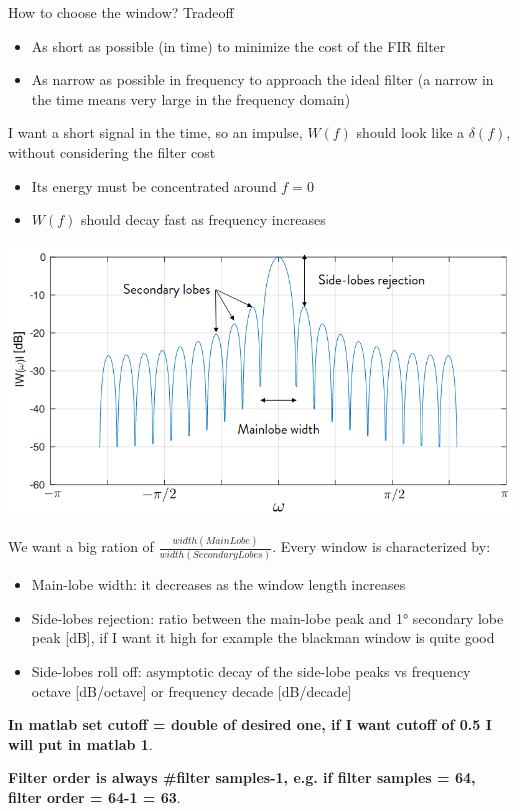 How to choose the window? Tradeoff
\begin{itemize}
    \item As short as possible (in time) to minimize the cost of the FIR filter
    \item As narrow as possible in frequency to approach the ideal filter (a narrow in the time means very large in the frequency domain)
\end{itemize}
I want a short signal in the time, so an impulse, $W(f)$ should look like a $\delta(f)$, without considering the filter cost
\begin{itemize}
    \item Its energy must be concentrated around $f=0$
    \item $W(f)$ should decay fast as frequency increases
\end{itemize}
\begin{center}
    \includegraphics[width=1\textwidth]{images/lobe.png}
\end{center}
We want a big ration of $\frac{width(MainLobe)}{width(SecondaryLobes)}$. Every window is characterized by:
\begin{itemize}
    \item Main-lobe width: it decreases as the window length increases
    \item Side-lobes rejection: ratio between the main-lobe peak and 1° secondary lobe peak [dB], if I want it high for example the blackman window is quite good
    \item Side-lobes roll off: asymptotic decay of the side-lobe peaks vs frequency octave [dB/octave] or frequency decade [dB/decade]
\end{itemize}
\textbf{In matlab set cutoff = double of desired one, if I want cutoff of 0.5 I will put in matlab 1}.

\textbf{Filter order is always \#filter samples-1, e.g. if filter samples = 64, filter order = 64-1 = 63}.

